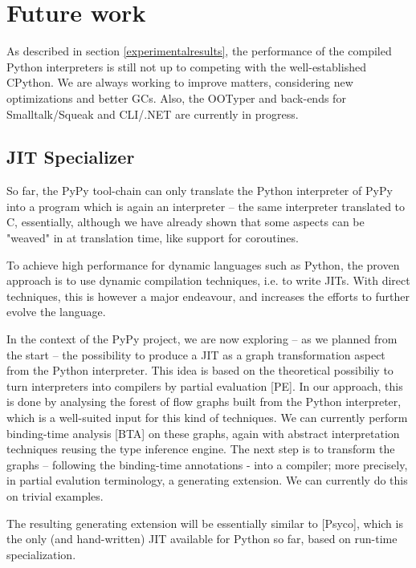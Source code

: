 \documentclass{acm_proc_article-sp}
\begin{document}
\section{Future work}
\label{futurework}


As described in section \ref{experimentalresults}, the performance of
the compiled Python interpreters is still not up to competing with the
well-established CPython.  We are always working to improve matters,
considering new optimizations and better GCs.  Also, the OOTyper and
back-ends for Smalltalk/Squeak and CLI/.NET are currently in progress.


\subsection{JIT Specializer}

So far, the PyPy tool-chain can only translate the Python interpreter of
PyPy into a program which is again an interpreter -- the same interpreter
translated to C, essentially, although we have already shown that some
aspects can be "weaved" in at translation time, like support for
coroutines.

To achieve high performance for dynamic languages such as Python, the
proven approach is to use dynamic compilation techniques, i.e. to write
JITs.  With direct techniques, this is however a major endeavour, and
increases the efforts to further evolve the language.

In the context of the PyPy project, we are now exploring -- as we planned
from the start -- the possibility to produce a JIT as a graph
transformation aspect from the Python interpreter.  This idea is based
on the theoretical possibiliy to turn interpreters into compilers by
partial evaluation [PE].  In our approach, this is done by analysing
the forest of flow graphs built from the Python interpreter, which is a
well-suited input for this kind of techniques.  We can currently perform
binding-time analysis [BTA] on these graphs, again with abstract
interpretation techniques reusing the type inference engine.  The next
step is to transform the graphs -- following the binding-time annotations
- into a compiler; more precisely, in partial evalution terminology, a
generating extension.  We can currently do this on trivial examples.

The resulting generating extension will be essentially similar to
[Psyco], which is the only (and hand-written) JIT available for Python so
far, based on run-time specialization.
\end{document}
